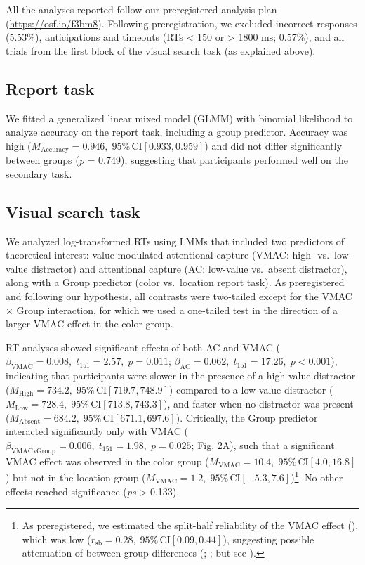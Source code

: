 \documentclass[
  man,
  floatsintext,
  longtable,
  nolmodern,
  notxfonts,
  notimes,
  colorlinks=true,linkcolor=blue,citecolor=blue,urlcolor=blue]{apa7}
\begin{document}
All the analyses reported follow our preregistered analysis plan
(\url{https://osf.io/f3bm8}). Following preregistration, we excluded
incorrect responses (5.53\%), anticipations and timeouts (RTs
\textless{} 150 or \textgreater{} 1800 ms; 0.57\%), and all trials from
the first block of the visual search task (as explained above).

\subsection{Report task}\label{report-task}

We fitted a generalized linear mixed model (GLMM) with binomial
likelihood to analyze accuracy on the report task, including a group
predictor. Accuracy was high
(\(M_{\text{Accuracy}} = 0.946, \;95\%\,\text{CI}[0.933, 0.959]\)) and
did not differ significantly between groups (\emph{p} = 0.749),
suggesting that participants performed well on the secondary task.

\subsection{Visual search task}\label{visual-search-task}

We analyzed log-transformed RTs using LMMs that included two predictors
of theoretical interest: value-modulated attentional capture (VMAC:
high- vs.~low-value distractor) and attentional capture (AC: low-value
vs.~absent distractor), along with a Group predictor (color vs.~location
report task). As preregistered and following our hypothesis, all
contrasts were two-tailed except for the VMAC × Group interaction, for
which we used a one-tailed test in the direction of a larger VMAC effect
in the color group.

RT analyses showed significant effects of both AC and VMAC
(\(\beta_{\mathrm{VMAC}} = 0.008, \; t_{151} = 2.57, \; p = 0.011\);
\(\beta_{\mathrm{AC}} = 0.062, \; t_{151} = 17.26, \; p < 0.001\)),
indicating that participants were slower in the presence of a high-value
distractor
(\(M_{\mathrm{High}} = 734.2,\;95\%\,\mathrm{CI}[719.7, 748.9]\))
compared to a low-value distractor
(\(M_{\mathrm{Low}} = 728.4,\;95\%\,\mathrm{CI}[713.8, 743.3]\)), and
faster when no distractor was present
(\(M_{\mathrm{Absent}} = 684.2,\;95\%\,\mathrm{CI}[671.1, 697.6]\)).
Critically, the Group predictor interacted significantly only with VMAC
(\(\beta_{\mathrm{VMAC x Group}} = 0.006, \; t_{151} = 1.98, \; p = 0.025\);
Fig. 2A), such that a significant VMAC effect was observed in the color
group (\(M_{\mathrm{VMAC}} = 10.4,\;95\%\,\mathrm{CI}[4.0, 16.8]\)) but
not in the location group
(\(M_{\mathrm{VMAC}} = 1.2,\;95\%\,\mathrm{CI}[-5.3, 7.6]\))\footnote{As
  preregistered, we estimated the split-half reliability of the VMAC
  effect (),
  which was low
  (\(r_{\text{sb}} = 0.28, \;95\%\,\text{CI}[0.09, 0.44]\)), suggesting
  possible attenuation of between-group differences
  (;
  ; but see
  ).}. No other effects reached
significance (\emph{ps} \textgreater{} 0.133).
\end{document}
